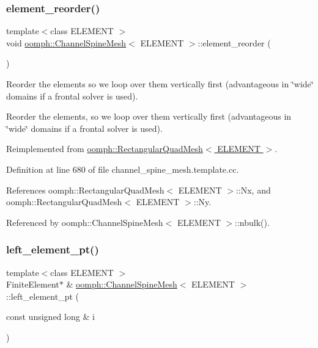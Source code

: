 \subsubsection{\texorpdfstring{element\+\_\+reorder()}{element\_reorder()}}
{\footnotesize\ttfamily template$<$class E\+L\+E\+M\+E\+NT $>$ \\
void \hyperlink{classoomph_1_1ChannelSpineMesh}{oomph\+::\+Channel\+Spine\+Mesh}$<$ E\+L\+E\+M\+E\+NT $>$\+::element\+\_\+reorder (\begin{DoxyParamCaption}{ }\end{DoxyParamCaption})\hspace{0.3cm}{\ttfamily [virtual]}}



Reorder the elements so we loop over them vertically first (advantageous in \char`\"{}wide\char`\"{} domains if a frontal solver is used). 

Reorder the elements, so we loop over them vertically first (advantageous in \char`\"{}wide\char`\"{} domains if a frontal solver is used). 

Reimplemented from \hyperlink{classoomph_1_1RectangularQuadMesh_ae1e1d67808d4efb6e16a3835162a4504}{oomph\+::\+Rectangular\+Quad\+Mesh$<$ E\+L\+E\+M\+E\+N\+T $>$}.



Definition at line 680 of file channel\+\_\+spine\+\_\+mesh.\+template.\+cc.



References oomph\+::\+Rectangular\+Quad\+Mesh$<$ E\+L\+E\+M\+E\+N\+T $>$\+::\+Nx, and oomph\+::\+Rectangular\+Quad\+Mesh$<$ E\+L\+E\+M\+E\+N\+T $>$\+::\+Ny.



Referenced by oomph\+::\+Channel\+Spine\+Mesh$<$ E\+L\+E\+M\+E\+N\+T $>$\+::nbulk().

\mbox{\label{classoomph_1_1ChannelSpineMesh_a84cbf50caead0aba0170246f4ce7330f}} 
\subsubsection{\texorpdfstring{left\+\_\+element\+\_\+pt()}{left\_element\_pt()}}
{\footnotesize\ttfamily template$<$class E\+L\+E\+M\+E\+NT $>$ \\
Finite\+Element$\ast$ \& \hyperlink{classoomph_1_1ChannelSpineMesh}{oomph\+::\+Channel\+Spine\+Mesh}$<$ E\+L\+E\+M\+E\+NT $>$\+::left\+\_\+element\+\_\+pt (\begin{DoxyParamCaption}\item[{const unsigned long \&}]{i }\end{DoxyParamCaption})\hspace{0.3cm}{\ttfamily [inline]}}



